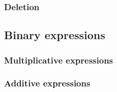 \documentclass[a4paper,12pt]{article}
\begin{document}
\subsubsection{Deletion}

\subsection{Binary expressions}
\label{sec:interface:binary-expr}

\subsubsection{Multiplicative expressions}

\subsubsection{Additive expressions}
\end{document}
